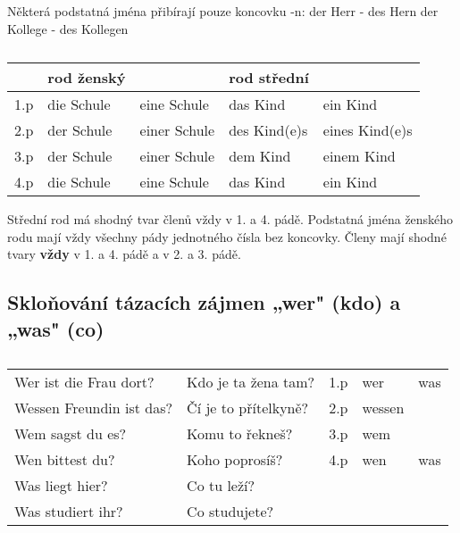       Některá podstatná jména přibírají pouze koncovku -n: der Herr - des Hern	der Kollege - des 
      Kollegen
  
      \begin{table}[ht!]
        \begin{tabular}{lllll}  %
          \hline
               & rod ženský      &                & rod střední     &                  \\ 
          \hline
           1.p &   die Schule    & eine Schule    &   das Kind      & ein Kind         \\
           2.p &   der Schule    & einer Schule   &   des Kind(e)s  & eines Kind(e)s   \\
           3.p &   der Schule    & einer Schule   &   dem Kind      & einem Kind       \\
           4.p &   die Schule    & eine Schule    &   das Kind      & ein Kind         \\
        \end{tabular}
        \caption*{}
      \end{table}
      Střední rod má shodný tvar členů vždy v 1. a 4. pádě. Podstatná jména ženského rodu mají vždy 
      všechny pády jednotného čísla bez koncovky. Členy mají shodné tvary \textbf{vždy} v 1. a 4. 
      pádě a v 2. a 3. pádě.
      
    \subsection*{Skloňování tázacích zájmen „wer" (kdo) a „was" (co)}
      \begin{table}[ht!] %
        \begin{tabular}{ll|lll}  
          \hline
          Wer ist die Frau dort?    & Kdo je ta žena tam?   & 1.p  & wer     & was      \\
          Wessen Freundin ist das?  & Čí je to přítelkyně?  & 2.p  & wessen  &          \\
          Wem sagst du es?          & Komu to řekneš?       & 3.p  & wem     &          \\
          Wen bittest du?           & Koho poprosíš?        & 4.p  & wen     & was      \\
          Was liegt hier?           & Co tu leží?           &      &         &          \\
          Was studiert ihr?         & Co studujete?         &      &         &          \\
          \hline
        \end{tabular}
        \caption*{}
      \end{table}
      

